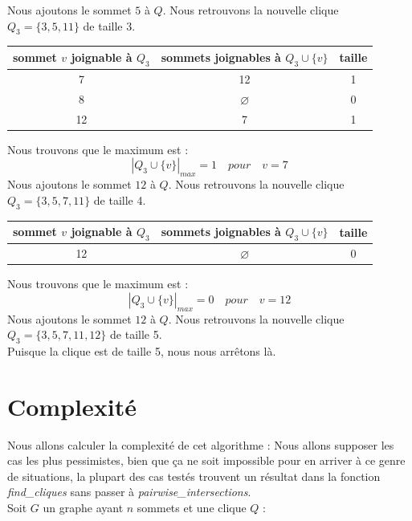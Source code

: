 \documentclass{article}
\begin{document}
Nous ajoutons le sommet $5$ à $Q$. Nous retrouvons la nouvelle clique \\
$Q_3=\{3, 5, 11\}$ de taille 3.
\begin{center}
  \begin{tabular}{|c|c|c|}
    \hline
    sommet $v$ joignable à $Q_3$ & sommets joignables à $Q_3\cup\{v\}$ & taille \\ \hline
    \hline
    7 	& 12 	            & 1 \\ \hline
    8 	& $ \varnothing$ 	& 0 \\ \hline
    12 	& 7 	            & 1 \\ \hline
  \end{tabular}
\end{center}
Nous trouvons que le maximum est :
\begin{displaymath}
  |Q_3 \cup \{v\}|_{max}=1 \quad pour \quad v=7
\end{displaymath}
Nous ajoutons le sommet $12$ à $Q$. Nous retrouvons la nouvelle clique \\
$Q_3=\{3, 5, 7, 11\}$ de taille 4.
\begin{center}
  \begin{tabular}{|c|c|c|}
    \hline
    sommet $v$ joignable à $Q_3$ & sommets joignables à $Q_3\cup\{v\}$ & taille \\ \hline
    \hline
    12    & $\varnothing$ & 0 \\ \hline
  \end{tabular}
\end{center}
Nous trouvons que le maximum est :
\begin{displaymath}
  |Q_3 \cup \{v\}|_{max}=0 \quad pour \quad v=12
\end{displaymath}
Nous ajoutons le sommet $12$ à $Q$. Nous retrouvons la nouvelle clique \\
$Q_3=\{3, 5, 7, 11, 12\}$ de taille 5.\\
Puisque la clique est de taille 5, nous nous arrêtons là.
\section{Complexité}
Nous allons calculer la complexité de cet algorithme :
Nous allons supposer les cas les plus pessimistes, bien que ça ne soit impossible pour en arriver
à ce genre de situations, la plupart des cas testés trouvent un résultat dans la fonction
\textit{find\_cliques} sans passer à \textit{pairwise\_intersections}.\\
Soit $G$ un graphe ayant $n$ sommets et une clique $Q$ :
\end{document}
